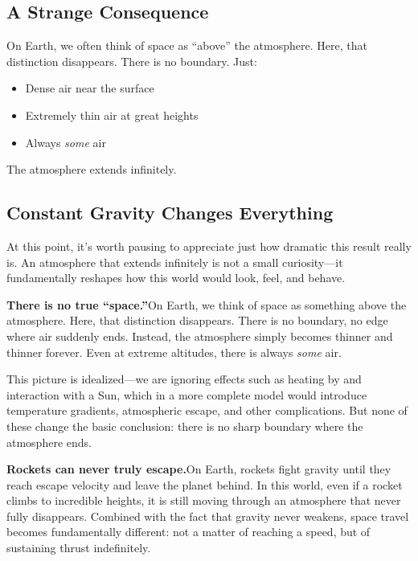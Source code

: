 \documentclass[11pt, letterpaper]{article}
\begin{document}
\subsection{A Strange Consequence}

On Earth, we often think of space as ``above'' the atmosphere. Here, that distinction disappears. There is no boundary. Just:

\begin{itemize}
\item Dense air near the surface
\item Extremely thin air at great heights
\item Always \textit{some} air
\end{itemize}

The atmosphere extends infinitely.

\subsection{Constant Gravity Changes Everything}

At this point, it’s worth pausing to appreciate just how dramatic this result really is. An atmosphere that extends infinitely is not a small curiosity---it fundamentally reshapes how this world would look, feel, and behave.

\textbf{There is no true ``space.''}\quad On Earth, we think of space as something above the atmosphere. Here, that distinction disappears. There is no boundary, no edge where air suddenly ends. Instead, the atmosphere simply becomes thinner and thinner forever. Even at extreme altitudes, there is always \textit{some} air.

This picture is idealized---we are ignoring effects such as heating by and interaction with a Sun, which in a more complete model would introduce temperature gradients, atmospheric escape, and other complications. But none of these change the basic conclusion: there is no sharp boundary where the atmosphere ends.

\medskip

\textbf{Rockets can never truly escape.}\quad On Earth, rockets fight gravity until they reach escape velocity and leave the planet behind. In this world, even if a rocket climbs to incredible heights, it is still moving through an atmosphere that never fully disappears. Combined with the fact that gravity never weakens, space travel becomes fundamentally different: not a matter of reaching a speed, but of sustaining thrust indefinitely.
\end{document}
